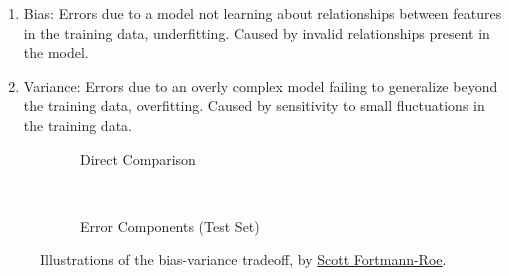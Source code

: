 \begin{enumerate}[noitemsep]
\item Bias: Errors due to a model not learning about relationships between features in the training data, \ie underfitting. Caused by invalid relationships present in the model.
\item Variance: Errors due to an overly complex model failing to generalize beyond the training data, \ie overfitting. Caused by sensitivity to small fluctuations in the training data.
\end{enumerate}

\begin{figure}[H]
  \centering

  \begin{subfigure}[b]{0.48\textwidth}\centering
    \usebox{\largestimage}
    \vspace{0.01cm}
  \caption{Direct Comparison}
  \label{fig:ml:bias_variance_tradeoff:direct}
  \end{subfigure}
  ~
  \begin{subfigure}[b]{\wd\largestimage}\centering
  \caption{Error Components (Test Set)}
  \label{fig:ml:bias_variance_tradeoff:error}
  \end{subfigure}
\caption{
Illustrations of the bias-variance tradeoff,
by \href{http://scott.fortmann-roe.com/docs/BiasVariance.html}{Scott Fortmann-Roe}.
\label{fig:ml:bias_variance_tradeoff}
}
\end{figure}


